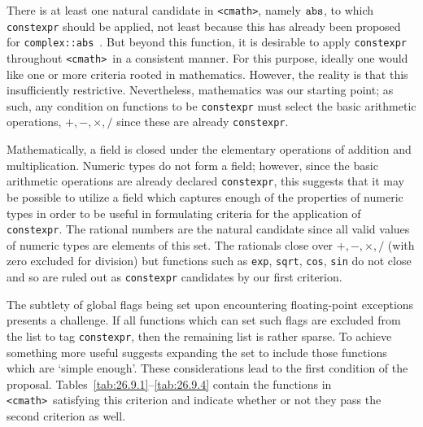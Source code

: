 \documentclass[prd,twocolumn,amsmath,amssymb,nofootinbib,eqsecnum]{revtex4-1}
\newcommand{\constexpr}{\code{constexpr}\xspace}
\newcommand{\code}[1]{{\tt #1}}
\newcommand{\header}[1]{{\tt <#1>}}
\newcommand{\cmath}{\header{cmath}}
\begin{document}
There is at least one natural candidate in \header{cmath}, namely $\code{abs}$,
to which \constexpr should be applied, not least because this has already been proposed
for \code{complex::abs}~\cite{AP-complex}. But beyond this function, it is desirable to
apply \constexpr throughout \cmath\ in a consistent manner. For this purpose, ideally one would
like one or more criteria rooted in mathematics. However, the reality is that
this insufficiently restrictive. Nevertheless, mathematics was our starting
point; as such, any condition on functions to be \constexpr must select the
basic arithmetic operations, $+,-,\times,/$ since these are already \constexpr.

Mathematically, a field is closed under the elementary operations of addition
and multiplication.
Numeric types do not form a field; however, since the basic arithmetic
operations are already declared \constexpr, this suggests that it may be
possible to utilize a field which captures enough of the properties of numeric
types in order to be useful in formulating criteria for the application of
\constexpr. The rational numbers are the natural candidate since all valid
values of numeric types are elements of this set. The rationals close over
$+,-,\times,/$ (with zero excluded for division)
but functions such as \code{exp}, \code{sqrt}, \code{cos},
\code{sin} do not close and so are ruled out as \constexpr candidates
by our first criterion.

The subtlety of global flags being set upon encountering floating-point
exceptions presents a challenge. If all functions which can set such flags are
excluded from the list to tag \constexpr, then the remaining list is rather
sparse. To achieve something more useful suggests expanding the set to include
those functions which are `simple enough'. These considerations lead to the
first condition of the proposal.
Tables~\ref{tab:26.9.1}--\ref{tab:26.9.4} contain the functions in \cmath\
satisfying this criterion and indicate whether or not they pass the second
criterion as well. 
\end{document}
